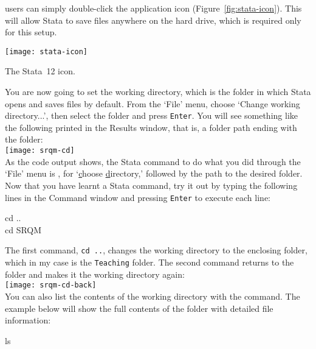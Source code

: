   \OSX users can simply double-click the application icon (Figure~\ref{fig:stata-icon}).  This will allow Stata to save files anywhere on the hard drive, which is required only for this setup.%

		\begin{marginfigure}
			\texttt{[image: stata-icon]}
			\caption{The Stata~12 icon.}
			\label{fig:stata-icon}
	  \end{marginfigure}
	 
	You are now going to set the working directory, which is the folder in which Stata opens and saves files by default. From the `File' menu, choose `Change working directory...', then select the \SRQM folder and press \texttt{Enter}. You will see something like the following printed in the Results window, that is, a folder path ending with the \SRQM folder:\\[1em]%
	
		\texttt{[image: srqm-cd]}\\[1em]

	As the code output shows, the Stata command to do what you did through the `File' menu is , for `\underline{c}hoose \underline{d}irectory,' followed by the path to the desired folder. Now that you have learnt a Stata command, try it out by typing the following lines in the Command window and pressing \texttt{Enter} to execute each line:%
	
	\begin{docspec}
		cd ..\\
		cd SRQM
	\end{docspec}
	
	The first command, \texttt{cd ..}, changes the working directory to the enclosing folder, which in my case is the \texttt{Teaching} folder. The second command returns to the \SRQM folder and makes it the working directory again:\\[1em]%
		
	\texttt{[image: srqm-cd-back]}\\[1em]
	
	You can also list the contents of the working directory with the  command. The example below will show the full contents of the \SRQM folder with detailed file information:%
	
		\begin{docspec}
			ls
		\end{docspec}


